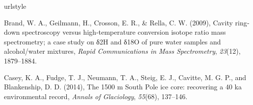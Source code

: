\documentclass[draft, jgrga]{AGUTeX}
\begin{document}
\begin{article}










\begin{thebibliography}{}

\providecommand{\natexlab}[1]{#1}
\expandafter\ifx\csname urlstyle\endcsname\relax
  \providecommand{\doi}[1]{doi:\discretionary{}{}{}#1}\else
  \providecommand{\doi}{doi:\discretionary{}{}{}\begingroup
  \urlstyle{rm}\Url}\fi


 Brand, W. A., Geilmann, H., Crosson, E. R., \& Rella, C. W. (2009), Cavity ring‐down spectroscopy versus high‐temperature conversion isotope ratio mass spectrometry; a case study on δ2H and δ18O of pure water samples and alcohol/water mixtures, \textit{Rapid Communications in Mass Spectrometry}, \textit{23}(12), 1879--1884.

 Casey, K. A., Fudge, T. J., Neumann, T. A., Steig, E. J., Cavitte, M. G. P., and Blankenship, D. D. (2014), The 1500 m South Pole ice core: recovering a 40 ka environmental record, \textit{Annals of Glaciology}, \textit{55}(68), 137--146.


\end{thebibliography}
\end{article}
\end{document}
